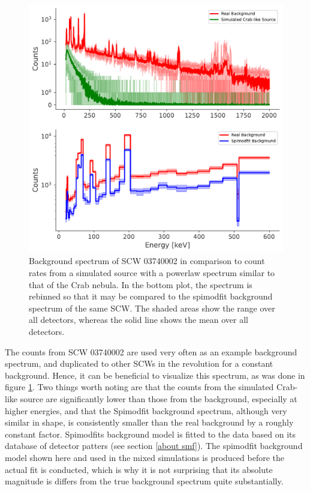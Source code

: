 \documentclass{report}
\begin{document}
\begin{figure}[h]
  \centering
  \includegraphics[width=\textwidth]{Images/PPC_and_Background_Analysis/background_spectrum.pdf}
  \caption{Background spectrum of SCW 03740002 in comparison to count rates from a simulated source with a powerlaw spectrum similar to that of the Crab nebula. In the bottom plot, the spectrum is rebinned so that it may be compared to the spimodfit background spectrum of the same SCW. The shaded areas show the range over all detectors, whereas the solid line shows the mean over all detectors.}
  \label{fig back spec}
\end{figure}

The counts from SCW 03740002 are used very often as an example background spectrum, and duplicated to other SCWs in the revolution for a constant background. Hence, it can be beneficial to visualize this spectrum, as was done in figure \ref{fig back spec}. Two things worth noting are that the counts from the simulated Crab-like source are significantly lower than those from the background, especially at higher energies, and that the Spimodfit background spectrum, although very similar in shape, is consistently smaller than the real background by a roughly constant factor. Spimodfits background model is fitted to the data based on its database of detector patters (see section \ref{about smf}). The spimodfit background model shown here and used in the mixed simulations is produced before the actual fit is conducted, which is why it is not surprising that its absolute magnitude is differs from the true background spectrum quite substantially. 
\end{document}
